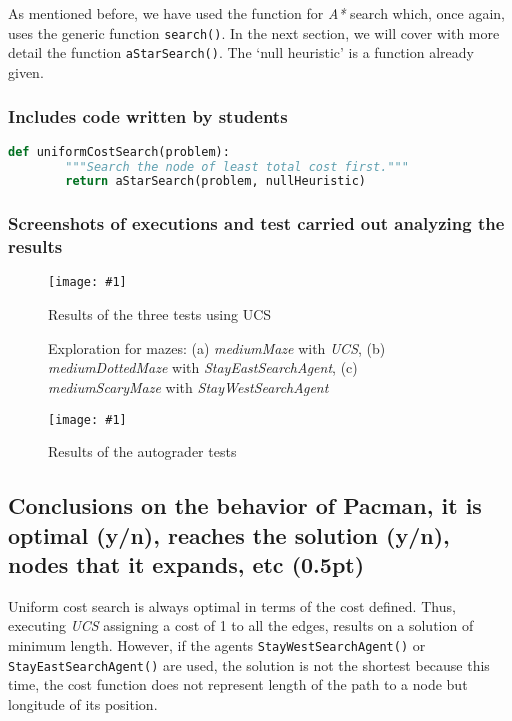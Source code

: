 \documentclass{article}
\newcommand{\myFigure}[4]{%
    \begin{figure}[H]
        \texttt{[image: \#1]}
        \centering
        \caption{#2}
        \label{#3}
    \end{figure}
}
\begin{document}
As mentioned before, we have used the function for \textit{A*} search which, once again, uses the generic function \texttt{search()}. In the next section, we will cover with more detail the function \texttt{aStarSearch()}. The `null heuristic' is a function already given.

\subsubsection{Includes code written by students}


\begin{lstlisting}[language=python,captionpos=t,caption={The \emph{UCS} function (\emph{search.py})}]
    def uniformCostSearch(problem):
        """Search the node of least total cost first."""
        return aStarSearch(problem, nullHeuristic)
\end{lstlisting}


\subsubsection{Screenshots of executions and test carried out analyzing the results}

\myFigure{./img/ex3/victoryUCS}{Results of the three tests using UCS}{victoryBFS}{.8}

\pagebreak

\begin{figure}[h!]
    \centering
    \caption{Exploration for mazes: (a) \emph{mediumMaze} with \emph{UCS}, (b) \emph{mediumDottedMaze} with \emph{StayEastSearchAgent}, (c) \emph{mediumScaryMaze} with \emph{StayWestSearchAgent}}
    \centering
    \label{exploration_e3}
\end{figure}

\pagebreak

\myFigure{./img/ex3/test3}{Results of the autograder tests}{test3}{.75}

\pagebreak

\subsection{Conclusions on the behavior of Pacman, it is optimal (y/n), reaches the solution (y/n), nodes that it expands, etc (0.5pt)}

Uniform cost search is always optimal in terms of the cost defined. Thus, executing \textit{UCS} assigning a cost of 1 to all the edges, results on a solution of minimum length. However, if the agents \texttt{StayWestSearchAgent()} or \texttt{StayEastSearchAgent()} are used, the solution is not the shortest because this time, the cost function does not represent length of the path to a node but longitude of its position.
\end{document}
